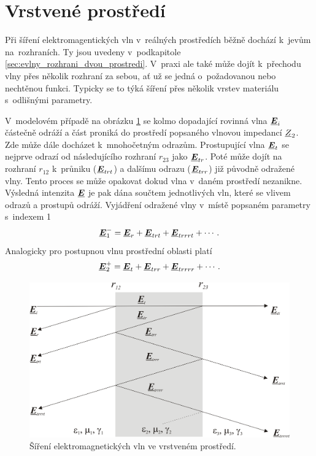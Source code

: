 \section{Vrstvené prostředí}
Při šíření elektromagentických vln v~reálných prostředích běžně dochází k~jevům na~rozhraních. Ty jsou uvedeny v~podkapitole \ref{sec:evlny_rozhrani_dvou_prostredi}. V~praxi ale také může dojít k~přechodu vlny přes několik rozhraní za sebou, ať už se jedná o~požadovanou nebo nechtěnou funkci. Typicky se to týká šíření přes několik vrstev materiálu s~odlišnými parametry.

V~modelovém případě na obrázku \ref{obr:evlny_vrstvene_rada} se kolmo dopadající rovinná vlna $\mbox{\underline{\boldmath$E$}}_{i}$ částečně odráží a část proniká do prostředí popsaného vlnovou impedancí ${\underline{Z}}_{2}$. Zde může dále docházet k~mnohočetným odrazům. Prostupující vlna $\mbox{\underline{\boldmath$E$}}_{t}$ se nejprve odrazí od následujícího rozhraní $r_{23}$ jako $\mbox{\underline{\boldmath$E$}}_{tr}$. Poté může dojít na rozhraní $r_{12}$  k~průniku ($\mbox{\underline{\boldmath$E$}}_{trt}$) a dalšímu odrazu ($\mbox{\underline{\boldmath$E$}}_{trr}$) již původně odražené vlny. Tento proces se může opakovat dokud vlna v~daném prostředí nezanikne. Výsledná intenzita $\mbox{\underline{\boldmath$E$}}$ je pak dána součtem jednotlivých vln, které se vlivem odrazů a prostupů odráží. Vyjádření odražené vlny v~místě popsaném parametry s~indexem 1
\begin{equation}
	\mbox{\underline{\boldmath$E$}}_{1}^{-} = \mbox{\underline{\boldmath$E$}}_{r} + \mbox{\underline{\boldmath$E$}}_{trt} + \mbox{\underline{\boldmath$E$}}_{trrrt} + \cdots.
	\label{rce:evlny_vrstvene_rada1}
\end{equation}
Analogicky pro postupnou vlnu prostřední oblasti platí
\begin{equation}
	\mbox{\underline{\boldmath$E$}}_{2}^{+} = \mbox{\underline{\boldmath$E$}}_{t} + \mbox{\underline{\boldmath$E$}}_{trr} + \mbox{\underline{\boldmath$E$}}_{trrrr} + \cdots.
	\label{rce:evlny_vrstvene_rada2}
\end{equation}
\begin{figure}[!h]
	\centering
	\includegraphics[width=12cm]{evlny_vrstvene_rada.png}
	\caption{Šíření elektromagnetických vln ve vrstveném prostředí. \cite{emp}}
	\label{obr:evlny_vrstvene_rada}
\end{figure}

